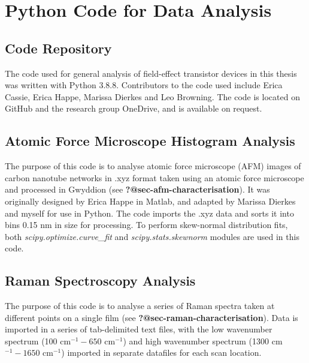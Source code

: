 \documentclass[
  a4paper,
]{scrbook}
\begin{document}
\hypertarget{python-code-for-data-analysis}{%
\chapter{Python Code for Data
Analysis}\label{python-code-for-data-analysis}}

\hypertarget{code-repository}{%
\section{Code Repository}\label{code-repository}}

The code used for general analysis of field-effect transistor devices in
this thesis was written with Python 3.8.8. Contributors to the code used
include Erica Cassie, Erica Happe, Marissa Dierkes and Leo Browning. The
code is located on GitHub and the research group OneDrive, and is
available on request.

\hypertarget{sec-histogram-analysis}{%
\section{Atomic Force Microscope Histogram
Analysis}\label{sec-histogram-analysis}}

The purpose of this code is to analyse atomic force microscope (AFM)
images of carbon nanotube networks in .xyz format taken using an atomic
force microscope and processed in Gwyddion (see
\textbf{?@sec-afm-characterisation}). It was originally designed by
Erica Happe in Matlab, and adapted by Marissa Dierkes and myself for use
in Python. The code imports the .xyz data and sorts it into bins 0.15 nm
in size for processing. To perform skew-normal distribution fits, both
\emph{scipy.optimize.curve\_fit} and \emph{scipy.stats.skewnorm} modules
are used in this code.

\hypertarget{sec-raman-analysis}{%
\section{Raman Spectroscopy Analysis}\label{sec-raman-analysis}}

The purpose of this code is to analyse a series of Raman spectra taken
at different points on a single film (see
\textbf{?@sec-raman-characterisation}). Data is imported in a series of
tab-delimited text files, with the low wavenumber spectrum (100
cm\(^{-1} - 650\) cm\(^{-1}\)) and high wavenumber spectrum (1300
cm\(^{-1} - 1650\) cm\(^{-1}\)) imported in separate datafiles for each
scan location.
\end{document}
